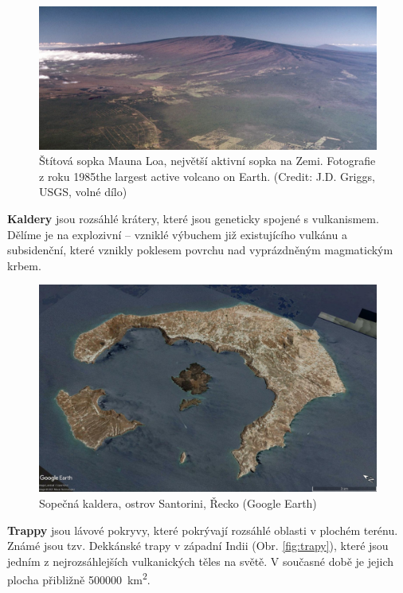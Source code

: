 \begin{figure}[h]
	\centering
	\includegraphics[width =1\textwidth]{obrazky/sopky/mauna_loa}
	\caption{Štítová sopka Mauna Loa, největší aktivní sopka na Zemi. Fotografie z roku 1985the largest active volcano on Earth. (Credit: J.D. Griggs, USGS, volné dílo)}
	\label{fig:maunaloa}
\end{figure}

\textbf{Kaldery} jsou rozsáhlé krátery, které jsou geneticky spojené s vulkanismem. Dělíme je na explozivní -- vzniklé výbuchem již existujícího vulkánu a subsidenční, které vznikly poklesem povrchu nad vyprázdněným magmatickým krbem. 

\begin{figure}[h]
	\centering
	\includegraphics[width =\linewidth]{obrazky/sopky/santorini}
	\caption{Sopečná kaldera, ostrov Santorini, Řecko (Google Earth)}
	\label{fig:santorini}
\end{figure}

\textbf{Trappy} jsou lávové pokryvy, které pokrývají rozsáhlé oblasti v plochém terénu. Známé jsou tzv. Dekkánské trapy v západní Indii (Obr. \ref{fig:trapy}), které jsou jedním z nejrozsáhlejších vulkanických těles na světě. V současné době je jejich plocha přibližně \SI{500000}{\kilo\metre\squared}. 

